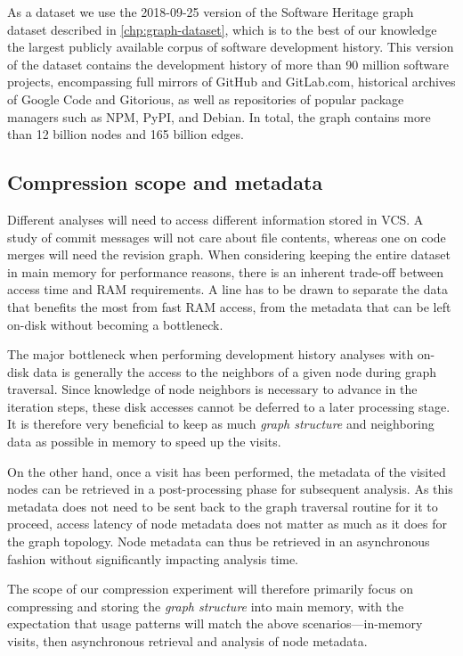 As a dataset we use the 2018-09-25 version of the Software Heritage graph dataset
described in \cref{chp:graph-dataset}, which is to the best of our
knowledge the largest publicly available corpus of software development
history. This version of the dataset contains the development history of more
than 90 million software projects, encompassing full mirrors of GitHub and
GitLab.com, historical archives of Google Code and Gitorious, as well as
repositories of popular package managers such as NPM, PyPI, and Debian.
In total, the graph contains more than 12 billion nodes and 165 billion edges.

\subsection{Compression scope and metadata}%
\label{sec:compression-comp-scope}

Different analyses will need to access different information stored in
\gls{VCS}\@. A study of commit messages will not care about file contents,
whereas one on code merges will need the revision graph. When considering
keeping the entire dataset in main memory for performance reasons, there is an
inherent trade-off between access time and RAM requirements. A line has to be
drawn to separate the data that benefits the most from fast RAM access, from
the metadata that can be left on-disk without becoming a bottleneck.

The major bottleneck when performing development history analyses with on-disk
data is generally the access to the neighbors of a given node during graph
traversal. Since knowledge of node neighbors is necessary to advance in the
iteration steps, these disk accesses cannot be deferred to a later processing
stage. It is therefore very beneficial to keep as much \emph{graph structure}
and neighboring data as possible in memory to speed up the visits.

On the other hand, once a visit has been performed, the metadata of the visited
nodes can be retrieved in a post-processing phase for subsequent analysis. As
this metadata does not need to be sent back to the graph traversal routine for
it to proceed, access latency of node metadata does not matter as much as it
does for the graph topology. Node metadata can thus be retrieved in an
asynchronous fashion without significantly impacting analysis time.

The scope of our compression experiment will therefore primarily focus on
compressing and storing the \emph{graph structure} into main memory, with the
expectation that usage patterns will match the above scenarios---in-memory
visits, then asynchronous retrieval and analysis of node metadata.

